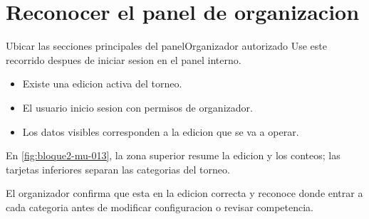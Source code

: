 \section{Reconocer el panel de organizacion}


\begin{procedimiento}{Ubicar las secciones principales del panel}{Organizador autorizado}
Use este recorrido despues de iniciar sesion en el panel interno.
\end{procedimiento}

\begin{precondiciones}
\begin{itemize}
    \item Existe una edicion activa del torneo.
    \item El usuario inicio sesion con permisos de organizador.
    \item Los datos visibles corresponden a la edicion que se va a operar.
\end{itemize}
\end{precondiciones}


En \cref{fig:bloque2-mu-013}, la zona superior resume la edicion y los conteos; las tarjetas inferiores separan las categorias del torneo.

\begin{resultadoesperado}
El organizador confirma que esta en la edicion correcta y reconoce donde entrar a cada categoria antes de modificar configuracion o revisar competencia.
\end{resultadoesperado}

